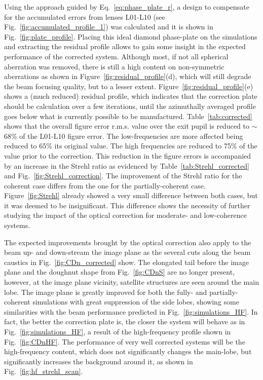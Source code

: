 \begin{refsection}
Using the approach guided by Eq.~\ref{eq:phase_plate_r}, a design to compensate for the accumulated errors from lenses L01-L10 (see  Fig.~\ref{fig:accumulated_profile_1}) was calculated and it is shown in Fig.~\ref{fig:plate_profile}. Placing this ideal diamond phase-plate on the simulations and extracting the residual profile allows to gain some insight in the expected performance of the corrected system. Although most, if not all spherical aberration was removed, there is still a high content on non-symmetric aberrations as shown in Figure~\ref{fig:residual_profile}(d), which will still degrade the beam focusing quality, but to a lesser extent. Figure~\ref{fig:residual_profile}(e) shows a (much reduced) residual profile, which indicates that the correction plate should be calculation over a few iterations, until the azimuthally averaged profile goes below what is currently possible to be manufactured. Table~\ref{tab:corrected} shows that the overall figure error r.m.s. value over the exit pupil is reduced to $\sim$68\% of the L01-L10 figure error. The low-frequencies are more affected being reduced to 65\% its original value. The high frequencies are reduced to 75\% of the value prior to the correction. This reduction in the figure errors is accompanied by an increase in the Strehl ratio as evidenced by Table~\ref{tab:Strehl_corrected} and Fig.~\ref{fig:Strehl_correction}. The improvement of the Strehl ratio for the coherent case differs from the one for the partially-coherent case. Figure~\ref{fig:Strehl} already showed a very small difference between both cases, but it was deemed to be insignificant. This difference shows the necessity of further studying the impact of the optical correction for moderate- and low-coherence systems.

The expected improvements brought by the optical correction also apply to the beam up- and down-stream the image plane as the several cuts along the beam caustics in Fig.~\ref{fig:CDn_corrected} show. The elongated tail before the image plane and the doughnut shape from Fig.~\ref{fig:CDnS} are no longer present, however, at the image plane vicinity, satellite structures are seen around the main lobe. The image plane is greatly improved for both the fully- and partially-coherent simulations with great suppression of the side lobes, showing some similarities with the beam performance predicted in Fig.~\ref{fig:simulations_HF}. In fact, the better the correction plate is, the closer the system will behave as in Fig.~\ref{fig:simulations_HF}, a result of the high-frequency profile shown in Fig.~\ref{fig:CDnHF}. The performance of very well corrected systems will be the high-frequency content, which does not significantly changes the main-lobe, but significantly increases the background around it, as shown in Fig.~\ref{fig:hf_strehl_scan}.


\end{refsection}
